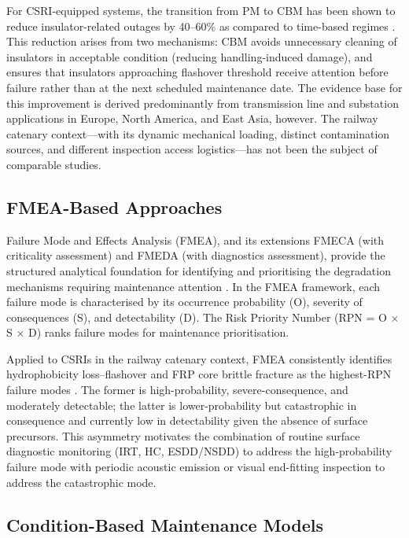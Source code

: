 \documentclass[preprint,12pt,3p]{elsarticle}
\begin{document}
For CSRI-equipped systems, the transition from PM to CBM has been
shown to reduce insulator-related outages by 40--60\% as compared to
time-based regimes \cite{Gubanski1990, Chege2019}. This reduction
arises from two mechanisms: CBM avoids unnecessary cleaning of
insulators in acceptable condition (reducing handling-induced damage),
and ensures that insulators approaching flashover threshold receive
attention before failure rather than at the next scheduled maintenance
date. The evidence base for this improvement is derived predominantly
from transmission line and substation applications in Europe, North
America, and East Asia, however. The railway catenary context---with
its dynamic mechanical loading, distinct contamination sources, and
different inspection access logistics---has not been the subject of
comparable studies.

\subsection{FMEA-Based Approaches}

Failure Mode and Effects Analysis (FMEA), and its extensions
FMECA (with criticality assessment) and FMEDA (with diagnostics
assessment), provide the structured analytical foundation for
identifying and prioritising the degradation mechanisms requiring
maintenance attention \cite{IEC60300}. In the FMEA framework,
each failure mode is characterised by its occurrence probability (O),
severity of consequences (S), and detectability (D). The Risk Priority
Number (RPN = O $\times$ S $\times$ D) ranks failure modes for
maintenance prioritisation.

Applied to CSRIs in the railway catenary context, FMEA consistently
identifies hydrophobicity loss--flashover and FRP core brittle
fracture as the highest-RPN failure modes \cite{Diagnostics2021, Mehmood2022}.
The former is high-probability, severe-consequence, and moderately
detectable; the latter is lower-probability but catastrophic in
consequence and currently low in detectability given the absence of
surface precursors. This asymmetry motivates the combination of
routine surface diagnostic monitoring (IRT, HC, ESDD/NSDD) to address
the high-probability failure mode with periodic acoustic emission or
visual end-fitting inspection to address the catastrophic mode.

\subsection{Condition-Based Maintenance Models}
\end{document}
